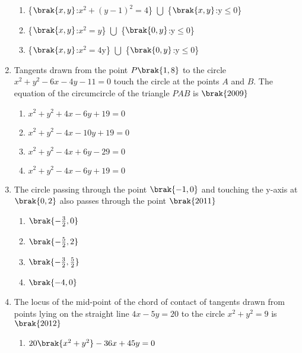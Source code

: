 \begin{enumerate}
\begin{multicols}{2}
\begin{enumerate}
         \item \{$\brak{x,y}$:$x^2+(y-1)^2=4$\} $\bigcup$ \{$\brak{x,y}$:y$\le$0\}
         \item \{$\brak{x,y}$:$x^2=y$\} $\bigcup$ \{$\brak{0,y}$:y$\le$0\}
         \item \{$\brak{x,y}$:$x^2=4$y\} $\bigcup$ \{$\brak{0,y}$:y$\le$0\}
         \end{enumerate}
         \end{multicols}
         \item Tangents drawn from the point $P\brak{1,8}$ to the circle $x^2+y^2-6x-4y-11=0$ touch the circle at the points $A$ and $B$. The equation of the circumcircle of the triangle $PAB$ is
             \hfill$\brak{2009}$
             \begin{multicols}{2}
         \begin{enumerate}
             \item $x^2+y^2+4x-6y+19=0$
             \item $x^2+y^2-4x-10y+19=0$
             \item $x^2+y^2-4x+6y-29=0$
             \item $x^2+y^2-4x-6y+19=0$
             \end{enumerate}
             \end{multicols}
             \item The circle passing through the point $\brak{-1,0}$ and touching the y-axis at $\brak{0,2}$ also passes through the point
                 \hfill$\brak{2011}$
                 \begin{multicols}{2}
             \begin{enumerate}
                 \item $\brak{-\frac{3}{2},0}$
                 \item $\brak{-\frac{5}{2},2}$
                 \item $\brak{-\frac{3}{2},\frac{5}{2}}$
                 \item $\brak{-4,0}$
             \end{enumerate}
             \end{multicols}
             \item The locus of the mid-point of the chord of contact of tangents drawn from points lying on the straight line $4x-5y=20$ to the circle $x^2+y^2=9$ is
                 \hfill$\brak{2012}$
                 \begin{multicols}{2}
             \begin{enumerate}
                 \item $20\brak{x^2+y^2}-36x+45y=0$

\end{enumerate}
\end{multicols}
\end{enumerate}

